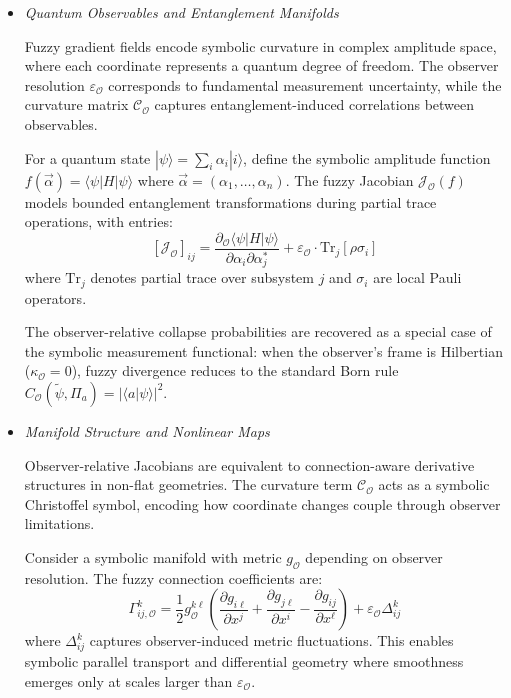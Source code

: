 \begin{itemize}

  \item[\textbf{quant-ph}] \textit{Quantum Observables and Entanglement Manifolds}  
  
  Fuzzy gradient fields encode symbolic curvature in complex amplitude space, where each coordinate represents a quantum degree of freedom. The observer resolution $\varepsilon_{\mathcal{O}}$ corresponds to fundamental measurement uncertainty, while the curvature matrix $\mathcal{C}_{\mathcal{O}}$ captures entanglement-induced correlations between observables.
  
  For a quantum state $|\psi\rangle = \sum_i \alpha_i |i\rangle$, define the symbolic amplitude function $f(\vec{\alpha}) = \langle \psi | H | \psi \rangle$ where $\vec{\alpha} = (\alpha_1, \ldots, \alpha_n)$. The fuzzy Jacobian $\mathcal{J}_{\mathcal{O}}(f)$ models bounded entanglement transformations during partial trace operations, with entries:
  \[
  [\mathcal{J}_{\mathcal{O}}]_{ij} = \frac{\partial_{\mathcal{O}} \langle \psi | H | \psi \rangle}{\partial \alpha_i \partial \alpha_j^*} + \varepsilon_{\mathcal{O}} \cdot \text{Tr}_{j}[\rho \sigma_i]
  \]
  where $\text{Tr}_j$ denotes partial trace over subsystem $j$ and $\sigma_i$ are local Pauli operators.
  
  The observer-relative collapse probabilities are recovered as a special case of the symbolic measurement functional: when the observer's frame is Hilbertian ($\kappa_\mathcal{O}=0$), fuzzy divergence reduces to the standard Born rule $C_{\mathcal{O}}(\tilde\psi,\Pi_a)=|\langle a|\psi\rangle|^2$.

  \item[\textbf{math-ph}] \textit{Manifold Structure and Nonlinear Maps}  
  
  Observer-relative Jacobians are equivalent to connection-aware derivative structures in non-flat geometries. The curvature term $\mathcal{C}_{\mathcal{O}}$ acts as a symbolic Christoffel symbol, encoding how coordinate changes couple through observer limitations.
  
  Consider a symbolic manifold with metric $g_{\mathcal{O}}$ depending on observer resolution. The fuzzy connection coefficients are:
  \[
  \Gamma^k_{ij,\mathcal{O}} = \frac{1}{2}g^{k\ell}_{\mathcal{O}} \left( \frac{\partial g_{i\ell}}{\partial x^j} + \frac{\partial g_{j\ell}}{\partial x^i} - \frac{\partial g_{ij}}{\partial x^\ell} \right) + \varepsilon_{\mathcal{O}} \Delta^k_{ij}
  \]
  where $\Delta^k_{ij}$ captures observer-induced metric fluctuations. This enables symbolic parallel transport and differential geometry where smoothness emerges only at scales larger than $\varepsilon_{\mathcal{O}}$.
  

\end{itemize}
